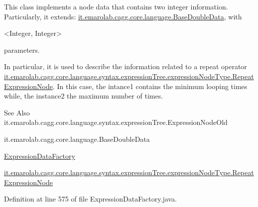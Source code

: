 This class implements a node data that contains two integer information. Particularly, it extends\-: \hyperlink{}{it.\-emarolab.\-cagg.\-core.\-language.\-Base\-Double\-Data}, with
\begin{DoxyCode}
<Integer, Integer> 
\end{DoxyCode}
 parameters.\par


In particular, it is used to describe the information related to a repeat operator \hyperlink{classit_1_1emarolab_1_1cagg_1_1core_1_1language_1_1syntax_1_1expressionTree_1_1expressionNodeType_1_1RepeatExpressionNode}{it.\-emarolab.\-cagg.\-core.\-language.\-syntax.\-expression\-Tree.\-expression\-Node\-Type.\-Repeat\-Expression\-Node}. In this case, the intance1 contains the minimum looping times while, the instance2 the maximum number of times. 

\begin{DoxySeeAlso}{See Also}
it.\-emarolab.\-cagg.\-core.\-language.\-syntax.\-expression\-Tree.\-Expression\-Node\-Old 

it.\-emarolab.\-cagg.\-core.\-language.\-Base\-Double\-Data 

\hyperlink{classit_1_1emarolab_1_1cagg_1_1core_1_1language_1_1syntax_1_1expressionTree_1_1ExpressionDataFactory}{Expression\-Data\-Factory} 

\hyperlink{classit_1_1emarolab_1_1cagg_1_1core_1_1language_1_1syntax_1_1expressionTree_1_1expressionNodeType_1_1RepeatExpressionNode}{it.\-emarolab.\-cagg.\-core.\-language.\-syntax.\-expression\-Tree.\-expression\-Node\-Type.\-Repeat\-Expression\-Node} 
\end{DoxySeeAlso}


Definition at line 575 of file Expression\-Data\-Factory.\-java.



